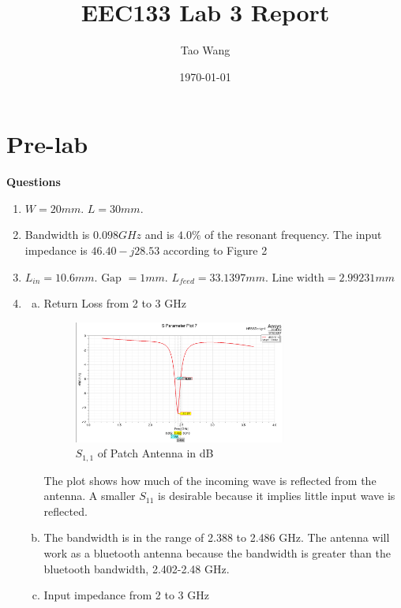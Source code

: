 \documentclass{article} %
\begin{document}
\title{EEC133 Lab 3 Report}
\author{Tao Wang}
\date{\today}

\maketitle

\section*{Pre-lab}
\textbf{Questions}
\begin{enumerate}[(1)]
    \item $W = 20 \si{mm}$. $L = 30 \si{mm}$.
    \item Bandwidth is $\boxed{0.098 GHz}$ and is $\boxed{4.0\%}$ of the resonant frequency. The input impedance is $46.40 - j28.53$ according to Figure 2
    \item $L_{in} = 10.6 \si{mm}$. $\text{Gap }=1 \si{mm}$. $L_{feed} = 33.1397 \si{mm}$. $\text{Line width} = 2.99231 \si{mm}$
    \item
          \begin{enumerate}[(a)]
              \item Return Loss from 2 to 3 GHz
                    \begin{figure}[H]
                        \centering
                        \includegraphics[width=0.7\textwidth]{./image/figure1.png}
                        \caption{$S_{1, 1}$ of Patch Antenna in dB}
                    \end{figure}
                    The plot shows how much of the incoming wave is reflected from the antenna. A smaller $S_{11}$ is desirable because it implies little input wave is reflected.
              \item The bandwidth is in the range of 2.388 to 2.486 GHz. The antenna will work as a bluetooth antenna because the bandwidth is greater than the bluetooth bandwidth, 2.402-2.48 GHz.
              \item Input impedance from 2 to 3 GHz

\end{enumerate}
\end{enumerate}
\end{document}
